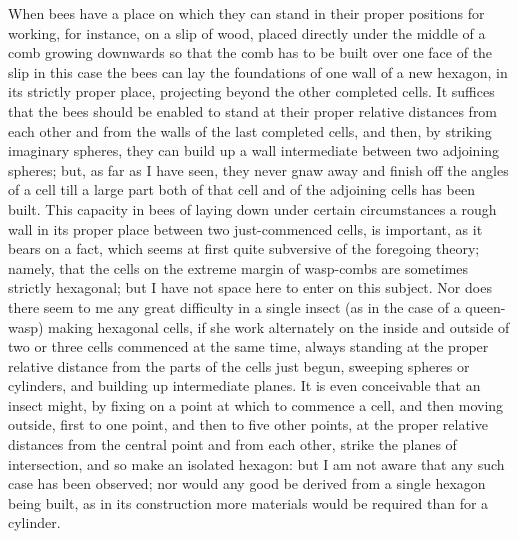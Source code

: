 \indent When bees have a place on which they can stand in their proper positions for working, for instance, on a slip of wood, placed directly under the middle of a comb growing downwards so that the comb has to be built over one face of the slip in this case the bees can lay the foundations of one wall of a new hexagon, in its strictly proper place, projecting beyond the other completed cells. It suffices that the bees should be enabled to stand at their proper relative distances from each other and from the walls of the last completed cells, and then, by striking imaginary spheres, they can build up a wall intermediate between two adjoining spheres; but, as far as I have seen, they never gnaw away and finish off the angles of a cell till a large part both of that cell and of the adjoining cells has been built. This capacity in bees of laying down under certain circumstances a rough wall in its proper place between two just-commenced cells, is important, as it bears on a fact, which seems at first quite subversive of the foregoing theory; namely, that the cells on the extreme margin of wasp-combs are sometimes strictly hexagonal; but I have not space here to enter on this subject. Nor does there seem to me any great difficulty in a single insect (as in the case of a queen-wasp) making hexagonal cells, if she work alternately on the inside and outside of two or three cells commenced at the same time, always standing at the proper relative distance from the parts of the cells just begun, sweeping spheres or cylinders, and building up intermediate planes. It is even conceivable that an insect might, by fixing on a point at which to commence a cell, and then moving outside, first to one point, and then to five other points, at the proper relative distances from the central point and from each other, strike the planes of intersection, and so make an isolated hexagon: but I am not aware that any such case has been observed; nor would any good be derived from a single hexagon being built, as in its construction more materials would be required than for a cylinder.\\
